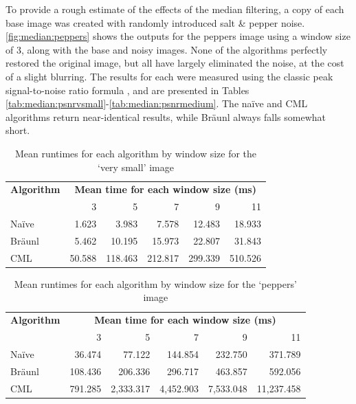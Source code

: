 To provide a rough estimate of the effects of the median filtering, a copy of each base image was created with randomly introduced salt \& pepper noise.  \autoref{fig:median:peppers} shows the outputs for the peppers image using a window size of 3, along with the base and noisy images.  None of the algorithms perfectly restored the original image, but all have largely eliminated the noise, at the cost of a slight blurring.  The results for each were measured using the classic peak signal-to-noise ratio formula \cite{Boncelet2005}, and are presented in Tables \ref{tab:median:psnrvsmall}-\ref{tab:median:psnrmedium}.  The naïve and CML algorithms return near-identical results, while Bräunl always falls somewhat short.  %

\begin{table}
\centering
\caption{Mean runtimes for each algorithm by window size for the `very small' image}
\label{tab:median:verysmall}
\begin{tabular}{@{}lrrrrr@{}}
\toprule
\multicolumn{1}{c}{\textbf{Algorithm}} & \multicolumn{5}{c}{\textbf{Mean time for each window size (ms)}} \\
                              & 3        & 5         & 7         & 9         & 11       \\ \midrule
Naïve                         & 1.623    & 3.983     & 7.578     & 12.483    & 18.933   \\
Bräunl                        & 5.462    & 10.195    & 15.973    & 22.807    & 31.843   \\
CML                           & 50.588   & 118.463   & 212.817   & 299.339   & 510.526  \\ \bottomrule
\end{tabular}
\end{table}

\begin{table}
\centering
\caption{
\label{tab:median:peppers}Mean runtimes for each algorithm by window size for the `peppers' image}
\begin{tabular}{@{}lrrrrr@{}}
\toprule
\multicolumn{1}{c}{\textbf{Algorithm}} & \multicolumn{5}{c}{\textbf{Mean time for each window size (ms)}}  \\
                              & 3       & 5         & 7         & 9         & 11         \\ \midrule
Naïve                         & 36.474  & 77.122    & 144.854   & 232.750   & 371.789    \\
Bräunl                        & 108.436 & 206.336   & 296.717   & 463.857   & 592.056    \\
CML                           & 791.285 & 2,333.317 & 4,452.903 & 7,533.048 & 11,237.458 \\ \bottomrule
\end{tabular}
\end{table}

